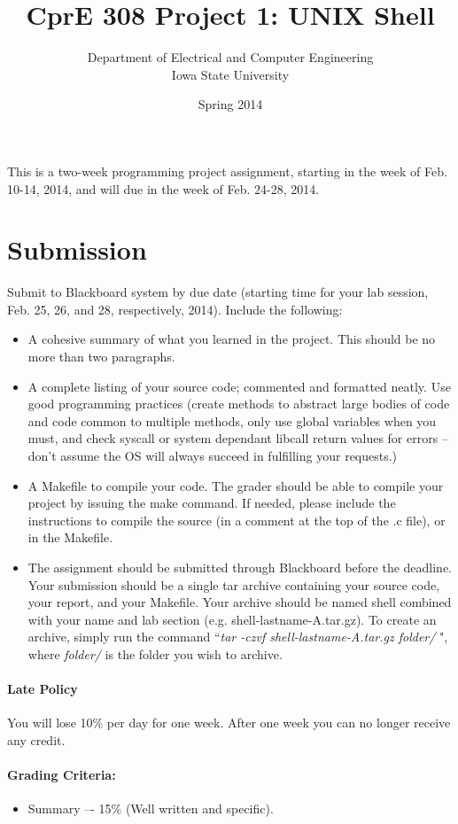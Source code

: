\documentclass[letterpaper,10pt]{article}
\title{CprE 308 Project 1: UNIX Shell}
\author{Department of Electrical and Computer Engineering \\ Iowa State University}
\date{Spring 2014}
\begin{document}
\maketitle

This is a two-week programming project assignment, starting in the week of Feb. 10-14, 2014, 
and will due in the week of Feb. 24-28, 2014.

\section{Submission}
Submit to Blackboard system by due date (starting time for your lab session, Feb. 25, 26, and 28, respectively, 2014). 
Include the following:
\begin{itemize}
 \item A cohesive summary of what you learned in the project. This should be no more than two paragraphs.
 \item A complete listing of your source code; commented and formatted neatly. Use good programming practices
  (create methods to abstract large bodies of code and code common to multiple methods, only use global
  variables when you must, and check syscall or system dependant libcall return values for errors – don't assume
  the OS will always succeed in fulfilling your requests.)
 \item A Makefile to compile your code. The grader should be able to compile your project by issuing the make command. If needed, please include
 the instructions to compile the source (in a comment at the top of the .c file), or in the Makefile.
 \item The assignment should be submitted through Blackboard before the deadline. Your submission should 
 be a single tar archive containing your source code, your report, and your Makefile. 
 Your archive should be named shell combined with your name and lab section (e.g. shell-lastname-A.tar.gz). 
 To create an archive, simply run the command ``{\em tar -czvf shell-lastname-A.tar.gz folder/ }", 
 where {\em folder/ } is the folder you wish to archive.
\end{itemize}

\paragraph{Late Policy}
You will lose 10\% per day for one week. After one week you can no longer receive any credit.

\paragraph{Grading Criteria:}
\begin{itemize}
 \item Summary –- 15\% (Well written and specific).
\end{itemize}
\end{document}

